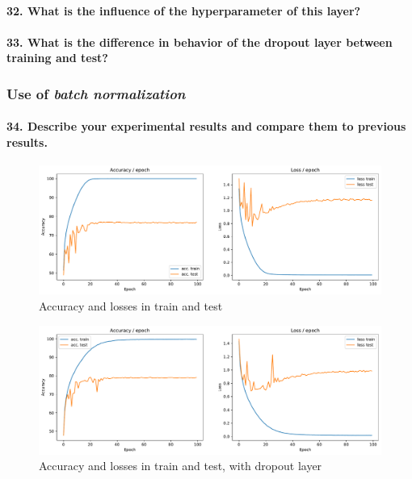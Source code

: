 \documentclass{article}
\theoremstyle{plain}%
\theoremstyle{definition}
\theoremstyle{remark}
\begin{document}
\paragraph{32. What is the influence of the hyperparameter of this layer?}

\paragraph{33. What is the difference in behavior of the dropout layer between training and test?}

\subsubsection{Use of \textit{batch normalization}}

\paragraph{34. Describe your experimental results and compare them to previous results.}

\begin{figure}[H]
    \centering
    \includegraphics*[width=\textwidth]{figs/CNN/batchnorm.pdf}
    \caption{Accuracy and losses in train and test}
    \label{fig:batchnorm}
\end{figure}

\begin{figure}[H]
    \centering
    \includegraphics*[width=\textwidth]{figs/CNN/batchnorm_with_dropout.pdf}
    \caption{Accuracy and losses in train and test, with dropout layer}
    \label{fig:batchnorm_with_dropout}
\end{figure}
\end{document}
